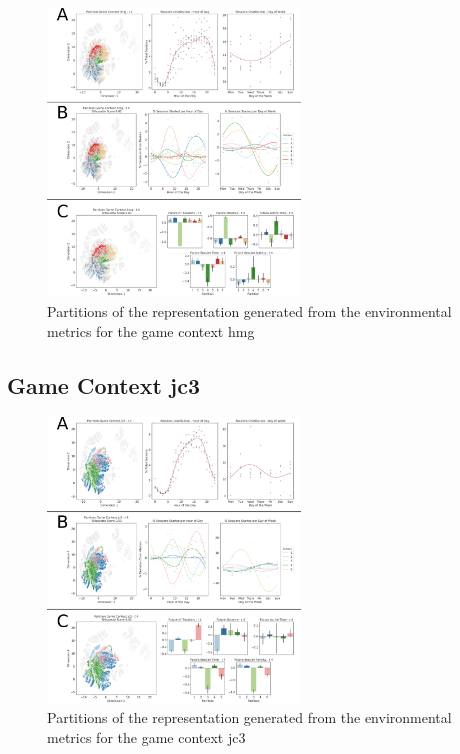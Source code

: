 \begin{figure}[!htb]
\includegraphics[width=0.6\textwidth]{images/appendix_D/clust_hmg_env.png}
\centering
\caption[\textbf{Partitions of the representation generated from the environmental metrics for the game context hmg}]{Partitions of the representation generated from the environmental metrics for the game context hmg}
\end{figure}
\FloatBarrier

\subsection{Game Context jc3}
\label{env_clust_jc3}

\begin{figure}[!htb]
\includegraphics[width=0.6\textwidth]{images/appendix_D/clust_env_jc3.png}
\centering
\caption[\textbf{Partitions of the representation generated from the environmental metrics for the game context jc3}]{Partitions of the representation generated from the environmental metrics for the game context jc3}
\end{figure}
\FloatBarrier

